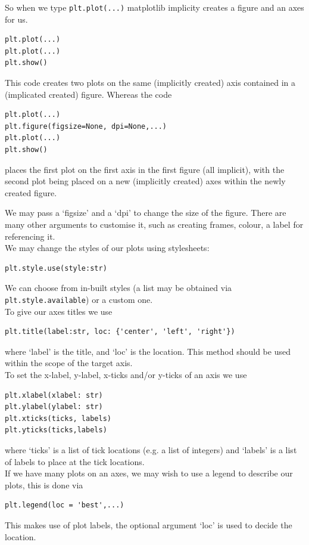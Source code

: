\documentclass[8pt]{extarticle}
\begin{document}
\begin{multicols}{4}
So when we type \lstinline[style=Python]!plt.plot(...)! matplotlib implicity creates a figure and an axes for us.
\begin{lstlisting}[style=Python]
plt.plot(...)
plt.plot(...)
plt.show()
\end{lstlisting}
This code creates two plots on the same (implicitly created) axis contained in a (implicated created) figure. Whereas the code
\begin{lstlisting}[style=Python]
plt.plot(...)
plt.figure(figsize=None, dpi=None,...)
plt.plot(...)
plt.show()
\end{lstlisting}
places the first plot on the first axis in the first figure (all implicit), with the second plot being placed on a new (implicitly created) axes within the newly created figure. 

We may pass a `figsize' and a `dpi' to change the size of the figure. There are many other arguments to customise it, such as creating frames, colour, a label for referencing it.\\

We may change the styles of our plots using stylesheets:

\begin{lstlisting}[style=Python]
plt.style.use(style:str)
\end{lstlisting}
We can choose from in-built styles (a list may be obtained via \lstinline[style=Python]!plt.style.available!) or a custom one.\\

To give our axes titles we use 
\begin{lstlisting}[style=Python]
plt.title(label:str, loc: {'center', 'left', 'right'})
\end{lstlisting}
where `label' is the title, and `loc' is the location. This method should be used within the scope of the target axis.\\

To set the x-label, y-label, x-ticks and/or y-ticks of an axis we use 
\begin{lstlisting}[style=Python]
plt.xlabel(xlabel: str)
plt.ylabel(ylabel: str)
plt.xticks(ticks, labels)
plt.yticks(ticks,labels)
\end{lstlisting}
where `ticks' is a list of tick locations (e.g. a list of integers) and `labels' is a list of labels to place at the tick locations. \\

If we have many plots on an axes, we may wish to use a legend to describe our plots, this is done via
\begin{lstlisting}[style=Python]
plt.legend(loc = 'best',...)
\end{lstlisting}
This makes use of plot labels, the optional argument `loc' is used to decide the location.\\


\end{multicols}
\end{document}
